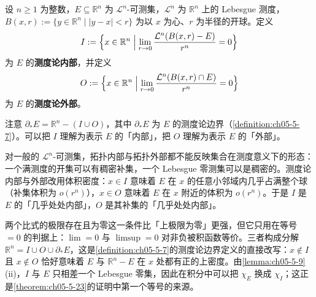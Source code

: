 \documentclass[../../main.tex]{subfiles}%
\begin{document}
\begin{definition}\label{definition:ch05-5-13}
设 $n\geqslant1$ 为整数，$E\subseteq\mathbb{R}^n$ 为 $\mathcal{L}^n$-可测集，$\mathcal{L}^n$ 为 $\mathbb{R}^n$ 上的 Lebesgue 测度，$B(x,r):=\{y\in\mathbb{R}^n\mid\lvert y-x\rvert<r\}$ 为以 $x$ 为心、$r$ 为半径的开球。定义
\begin{align*}
I:=\Bigl\{x\in\mathbb{R}^n\Bigm|\lim_{r\to0}\frac{\mathcal{L}^n(B(x,r)-E)}{r^n}=0\Bigr\}
\end{align*}
为 $E$ 的\textbf{测度论内部}，并定义
\begin{align*}
O:=\Bigl\{x\in\mathbb{R}^n\Bigm|\lim_{r\to0}\frac{\mathcal{L}^n(B(x,r)\cap E)}{r^n}=0\Bigr\}
\end{align*}
为 $E$ 的\textbf{测度论外部}。
\end{definition}

\begin{remark}\label{remark:ch05-def-5-13-内外}
注意 $\partial_*E=\mathbb{R}^n-(I\cup O)$，其中 $\partial_*E$ 为 $E$ 的测度论边界（\cref{definition:ch05-5-7}）。可以把 $I$ 理解为表示 $E$ 的「内部」，把 $O$ 理解为表示 $E$ 的「外部」。%
\end{remark}

\begin{remark}\label{remark:ch05-def-5-13-动机}
对一般的 $\mathcal{L}^n$-可测集，拓扑内部与拓扑外部都不能反映集合在测度意义下的形态：一个满测度的开集可以有稠密补集，一个 Lebesgue 零测集可以是稠密的。测度论内部与外部改用体积密度：$x\in I$ 意味着 $E$ 在 $x$ 的任意小邻域内几乎占满整个球（补集体积为 $o(r^n)$），$x\in O$ 意味着 $E$ 在 $x$ 附近的体积为 $o(r^n)$。于是 $I$ 是 $E$ 的「几乎处处内部」，$O$ 是其补集的「几乎处处内部」。

两个比式的极限存在且为零这一条件比「上极限为零」更强，但它只用在等号 $=0$ 的判据上：$\lim=0$ 与 $\limsup=0$ 对非负被积函数等价。三者构成分解 $\mathbb{R}^n=I\cup O\cup\partial_*E$，这是\cref{definition:ch05-5-7}的测度论边界定义的直接改写：$x\notin I$ 且 $x\notin O$ 恰好意味着 $E$ 与 $\mathbb{R}^n-E$ 在 $x$ 处都有正的上密度。由\cref{lemma:ch05-5-9}(ii)，$I$ 与 $E$ 只相差一个 Lebesgue 零集，因此在积分中可以把 $\chi_E$ 换成 $\chi_I$；这正是\cref{theorem:ch05-5-23}的证明中第一个等号的来源。%
\end{remark}
\end{document}
